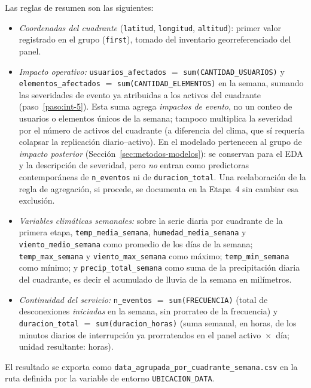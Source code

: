     Las reglas de resumen son las siguientes:
    
    \begin{itemize}
        \item \textit{Coordenadas del cuadrante} (\texttt{latitud}, \texttt{longitud}, \texttt{altitud}): primer valor registrado en el grupo (\texttt{first}), tomado del inventario georreferenciado del panel.
        
        \item \textit{Impacto operativo:} \texttt{usuarios\_afectados} $=$ \texttt{sum(CANTIDAD\_USUARIOS)} y \texttt{elementos\_afectados} $=$ \texttt{sum(CANTIDAD\_ELEMENTOS)} en la semana, sumando las severidades de evento ya atribuidas a los activos del cuadrante (paso~\ref{paso:int-5}). Esta suma agrega \textit{impactos de evento}, no un conteo de usuarios o elementos únicos de la semana; tampoco multiplica la severidad por el número de activos del cuadrante (a diferencia del clima, que sí requería colapsar la replicación diario--activo). En el modelado pertenecen al grupo de \textit{impacto posterior} (Sección~\ref{sec:metodos-modelos}): se conservan para el EDA y la descripción de severidad, pero \textit{no} entran como predictoras contemporáneas de \texttt{n\_eventos} ni de \texttt{duracion\_total}. Una reelaboración de la regla de agregación, si procede, se documenta en la Etapa~4 sin cambiar esa exclusión.
        
        \item \textit{Variables climáticas semanales:} sobre la serie diaria por cuadrante de la primera etapa, \texttt{temp\_media\_semana}, \texttt{humedad\_media\_semana} y \texttt{viento\_medio\_semana} como promedio de los días de la semana; \texttt{temp\_max\_semana} y \texttt{viento\_max\_semana} como máximo; \texttt{temp\_min\_semana} como mínimo; y \texttt{precip\_total\_semana} como suma de la precipitación diaria del cuadrante, es decir el acumulado de lluvia de la semana en milímetros.
        
        \item \textit{Continuidad del servicio:} \texttt{n\_eventos} $=$ \texttt{sum(FRECUENCIA)} (total de desconexiones \textit{iniciadas} en la semana, sin prorrateo de la frecuencia) y \texttt{duracion\_total} $=$ \texttt{sum(duracion\_horas)} (suma semanal, en horas, de los minutos diarios de interrupción ya prorrateados en el panel activo~$\times$~día; unidad resultante: horas).
    \end{itemize}
    
    El resultado se exporta como \texttt{data\_agrupada\_por\_cuadrante\_semana.csv} en la ruta definida por la variable de entorno \texttt{UBICACION\_DATA}.
    
